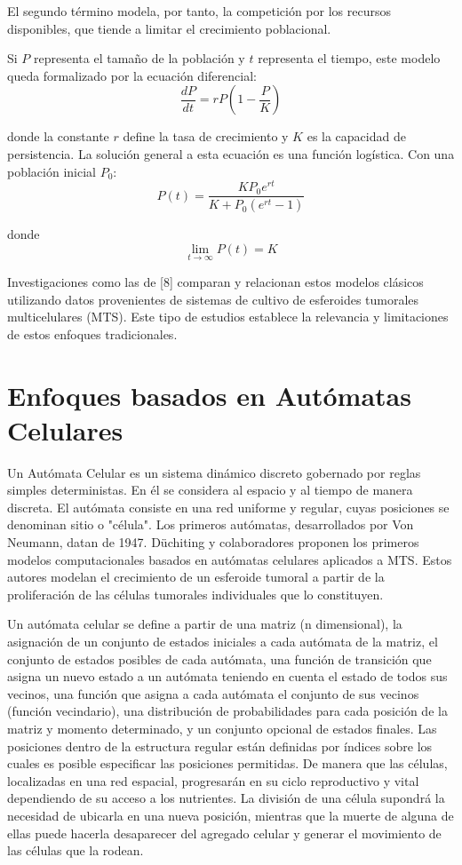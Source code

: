 El segundo término modela, por tanto, la competición por los recursos disponibles, que tiende a limitar el crecimiento poblacional.

Si $P$ representa el tamaño de la población y $t$ representa el tiempo, este modelo queda formalizado por la ecuación diferencial:
\begin{equation}
   \frac{dP}{dt} = rP(1 - \frac{P}{K})
\end{equation}

donde la constante $r$ define la tasa de crecimiento y $K$ es la capacidad de persistencia. La soluci\'on general a esta ecuación es una funci\'on logística. Con una poblaci\'on inicial $P_{0}$:
\begin{equation}
    P(t) = \frac{KP_{0}e^{rt}}{K + P_{0}(e^{rt} - 1)}
 \end{equation}

donde 
\begin{equation}
    \lim_{t \to \infty} P(t) = K
\end{equation}

Investigaciones como las de [8] comparan y relacionan estos modelos clásicos utilizando datos provenientes de sistemas de cultivo de esferoides tumorales multicelulares (MTS). Este tipo de estudios establece la relevancia y limitaciones de estos enfoques tradicionales.

\section{Enfoques basados en Autómatas Celulares}
Un Autómata Celular es un sistema dinámico discreto gobernado por reglas simples deterministas. En él se considera al espacio y al tiempo de manera discreta. El autómata consiste en una red uniforme y regular, cuyas posiciones se denominan sitio o "célula". Los primeros autómatas, desarrollados por Von Neumann, datan de 1947. D\"uchiting y colaboradores proponen los primeros modelos computacionales basados en autómatas celulares aplicados a MTS. Estos autores modelan el crecimiento de un esferoide tumoral a partir de la proliferación de las células tumorales individuales que lo constituyen.

Un autómata celular se define a partir de una matriz (n dimensional), la asignación de un conjunto de estados iniciales a cada autómata de la matriz, el conjunto de estados posibles de cada autómata, una función de transición que asigna un nuevo estado a un autómata teniendo en cuenta el estado de todos sus vecinos, una función que asigna a cada autómata el conjunto de sus vecinos (función vecindario), una distribución de probabilidades para cada posición de la matriz y momento determinado, y un conjunto opcional de estados finales. Las posiciones dentro de la estructura regular están definidas por índices sobre los cuales es posible especificar las posiciones permitidas. De manera que las células, localizadas en una red espacial, progresarán en su ciclo reproductivo y vital dependiendo de su acceso a los nutrientes. La división de una célula supondrá la necesidad de ubicarla en una nueva posición, mientras que la muerte de alguna de ellas puede hacerla desaparecer del agregado celular y generar el movimiento de las células que la rodean.


